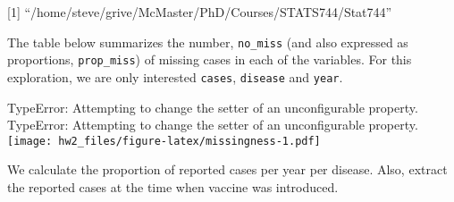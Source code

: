 \documentclass[]{article}
\newenvironment{Shaded}{\begin{snugshade}}{\end{snugshade}}
\newcommand{\ControlFlowTok}[1]{\textcolor[rgb]{0.13,0.29,0.53}{\textbf{#1}}}
\newcommand{\DataTypeTok}[1]{\textcolor[rgb]{0.13,0.29,0.53}{#1}}
\newcommand{\DecValTok}[1]{\textcolor[rgb]{0.00,0.00,0.81}{#1}}
\newcommand{\KeywordTok}[1]{\textcolor[rgb]{0.13,0.29,0.53}{\textbf{#1}}}
\newcommand{\NormalTok}[1]{#1}
\newcommand{\OperatorTok}[1]{\textcolor[rgb]{0.81,0.36,0.00}{\textbf{#1}}}
\newcommand{\OtherTok}[1]{\textcolor[rgb]{0.56,0.35,0.01}{#1}}
\newcommand{\StringTok}[1]{\textcolor[rgb]{0.31,0.60,0.02}{#1}}
\begin{document}
{[}1{]} ``/home/steve/grive/McMaster/PhD/Courses/STATS744/Stat744''

The table below summarizes the number, \texttt{no\_miss} (and also
expressed as proportions, \texttt{prop\_miss}) of missing cases in each
of the variables. For this exploration, we are only interested
\texttt{cases}, \texttt{disease} and \texttt{year}.

\begin{Shaded}
\end{Shaded}

TypeError: Attempting to change the setter of an unconfigurable
property. TypeError: Attempting to change the setter of an
unconfigurable property.
\texttt{[image: hw2\_files/figure-latex/missingness-1.pdf]}

We calculate the proportion of reported cases per year per disease.
Also, extract the reported cases at the time when vaccine was
introduced.
\end{document}
